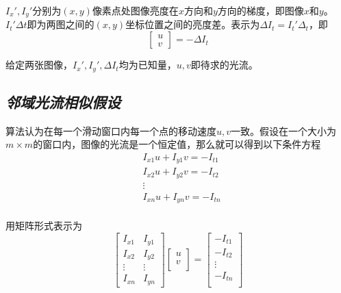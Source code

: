 $I_x',I_y'$分别为$(x,y)$像素点处图像亮度在$x$方向和$y$方向的梯度，即图像$x$和$y$。$I_t'\Delta t$即为两图之间的$(x,y)$坐标位置之间的亮度差。表示为$\Delta I_t=I_t'\Delta_t$，即
\begin{equation}
    [I_x',I_y']\left[\begin{array}{c}
        u\\
        v
    \end{array}\right]=-\Delta I_t
\end{equation}

给定两张图像，$I_x',I_y',\Delta I_t$均为已知量，$u,v$即待求的光流。

\subsection*{\textsl{邻域光流相似假设}}

算法认为在每一个滑动窗口内每一个点的移动速度$u,v$一致。假设在一个大小为$m\times m$的窗口内，图像的光流是一个恒定值，那么就可以得到以下条件方程
\begin{equation}
    \begin{aligned}
        & I_{x1}u+I_{y1}v=-I_{t1} \\
        & I_{x2}u+I_{y2}v=-I_{t2} \\
        & \vdots \\
        & I_{xn}u+I_{yn}v=-I_{tn} \\
    \end{aligned}
\end{equation}

用矩阵形式表示为
\begin{equation}
    \left[
        \begin{array}{cc}
            I_{x1} & I_{y1} \\
            I_{x2} & I_{y2} \\
            \vdots & \vdots \\
            I_{xn} & I_{yn}
        \end{array}
    \right]
    \left[
        \begin{array}{c}
            u \\
            v \\
        \end{array}
    \right]=
    \left[
        \begin{array}{c}
            -I_{t1} \\
            -I_{t2} \\
            \vdots \\
            -I_{tn} \\
        \end{array}
    \right]
\end{equation}

